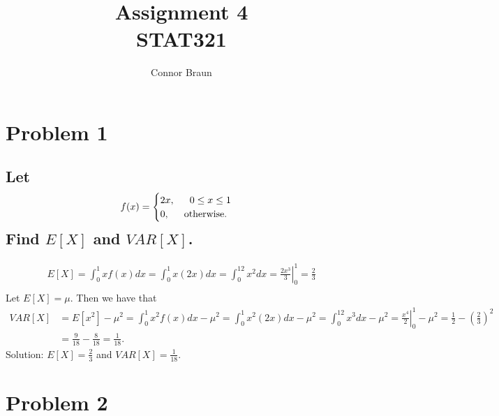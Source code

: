 \documentclass[11pt, letterpaper]{article}
\begin{document}
\title{Assignment 4\\\normalsize STAT321}
\author{Connor Braun}

\allowdisplaybreaks

\maketitle

\section*{Problem 1}
\subsection*{\normalfont Let 
\begin{align*}
    f(x)=
    \begin{cases}
        2x,\indent 0\leq x\leq 1\\
        0,\indent \text{otherwise}.
    \end{cases}
\end{align*}
Find $E[X]$ and $VAR[X]$.}
\begin{align*}
    E[X]=\int_0^1xf(x)dx=\int_0^1x(2x)dx=\int_0^12x^2dx=\left.\frac{2x^3}{3}\right|_0^1=\frac{2}{3}\\
\end{align*}
Let $E[X]=\mu$. Then we have that
\begin{align*}
    VAR[X]&=E[x^2]-\mu^2=\int_0^1x^2f(x)dx-\mu^2=\int_0^1x^2(2x)dx-\mu^2=\int_0^12x^3dx-\mu^2=\left.\frac{x^4}{2}\right|_0^1-\mu^2=\frac{1}{2}-\left(\frac{2}{3}\right)^2\\
    &=\frac{9}{18}-\frac{8}{18}=\frac{1}{18}.
\end{align*}
Solution: $E[X]=\frac{2}{3}$ and $VAR[X]=\frac{1}{18}$.
\section*{Problem 2}
\end{document}
